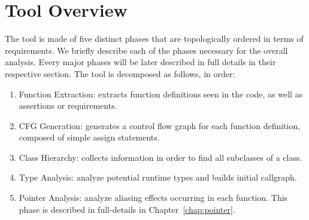 \chapter{Tool Overview}
\label{chap:overview}
The tool is made of five distinct phases that are topologically ordered in terms
of requirements. We briefly describe each of the phases necessary for the
overall analysis. Every major phases will be later described in full details in
their respective section.
The tool is decomposed as follows, in order:
\begin{enumerate}
    \item{Function Extraction}: extracts function definitions seen in the code, as well as
    assertions or requirements.

    \item{CFG Generation}: generates a control flow graph for each function
    definition, composed of simple assign statements.

    \item{Class Hierarchy}: collects information in order to find all subclasses of a class.

    \item{Type Analysis}: analyze potential runtime types and builds initial callgraph.

    \item{Pointer Analysis}: analyze aliasing effects occurring in each
    function. This phase is described in full-details in
    Chapter~\ref{chap:pointer}.
\end{enumerate}
